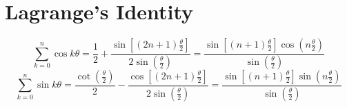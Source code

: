 \documentclass[letterpaper,12pt,fleqn]{article}
\renewcommand{\o}{\theta}
\begin{document}
\section*{Lagrange's Identity}
\begin{theorem}
\[\sum_{k=0}^n\cos k\o=
    \frac{1}{2}+
        \frac{\sin\left[(2n+1)\frac{\o}{2}\right]}
        {2\sin\left(\frac{\o}{2}\right)}=
    \frac{\sin\left[(n+1)\frac{\o}{2}\right]\cos\left(n\frac{\o}{2}\right)}
        {\sin\left(\frac{\o}{2}\right)}\]
\[\sum_{k=0}^n\sin k\o=
    \frac{\cot\left(\frac{\o}{2}\right)}{2}-
        \frac{\cos\left[(2n+1)\frac{\o}{2}\right]}
        {2\sin\left(\frac{\o}{2}\right)}=
    \frac{\sin\left[(n+1)\frac{\o}{2}\right]\sin\left(n\frac{\o}{2}\right)}
        {\sin\left(\frac{\o}{2}\right)}\]
\end{theorem}
\end{document}
